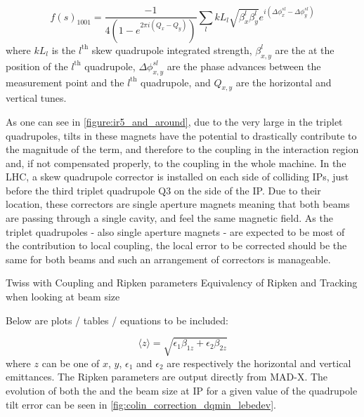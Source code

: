 \begin{equation}
    f(s)_{1001} = \frac{-1}{4\left(1-e^{2 \pi i\left(Q_x-Q_y\right)}\right)} \sum_l k L_l \sqrt{\beta_x^l \beta_y^l} e^{i\left(\Delta \phi_x^{s l}-\Delta \phi_y^{s l}\right)}
    \label{eq:skew_quad_contribution_to_f1001}
\end{equation}
where \(k L_l\) is the \(l^{\mathrm{th}}\) skew quadrupole integrated strength, \(\beta^l_{x,y}\) are the \betafunctions at the position of the \(l^{\mathrm{th}}\) quadrupole, \(\Delta \phi^{sl}_{x,y}\) are the phase advances between the measurement point and the \(l^{\mathrm{th}}\) quadrupole, and \(Q_{x,y}\) are the horizontal and vertical tunes.

As one can see in \cref{figure:ir5_and_around}, due to the very large \betafunctions in the triplet quadrupoles, tilts in these magnets have the potential to drastically contribute to the magnitude of the \foneohone term, and therefore to the coupling in the interaction region and, if not compensated properly, to the coupling in the whole machine.
In the LHC, a skew quadrupole corrector is installed on each side of colliding IPs, just before the third triplet quadrupole \(\mathrm{Q3}\) on the side of the IP.
Due to their location, these correctors are single aperture magnets meaning that both beams are passing through a single cavity, and feel the same magnetic field.
As the triplet quadrupoles - also single aperture magnets - are expected to be most of the contribution to local coupling, the local error to be corrected should be the same for both beams and such an arrangement of correctors is manageable.


Twiss with Coupling and Ripken parameters
Equivalency of Ripken and Tracking when looking at beam size

Below are plots / tables / equations to be included:

\begin{equation}
    \langle z \rangle = \sqrt{\epsilon_{1} \beta_{1z} + \epsilon_{2} \beta_{2z}}
    \label{eq:lebedev_beam_size}
\end{equation}
where $z$ can be one of $x$, $y$, $\epsilon_{1}$ and $\epsilon_{2}$ are respectively the horizontal and vertical emittances.
The Ripken parameters are output directly from MAD-X.
The evolution of both the \AbsCminus and the beam size at IP for a given value of the quadrupole tilt error can be seen in \cref{fig:colin_correction_dqmin_lebedev}.

